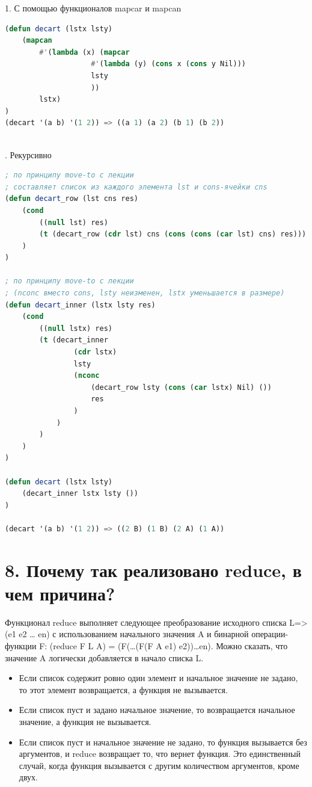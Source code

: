 \documentclass[12pt]{report}
\begin{document}
1. С помощью функционалов mapcar и mapcan
\begin{lstlisting}[language=Lisp]
(defun decart (lstx lsty) 
	(mapcan 
		#'(lambda (x) (mapcar 
					#'(lambda (y) (cons x (cons y Nil))) 
					lsty
					))
		lstx)
)	
(decart '(a b) '(1 2)) => ((a 1) (a 2) (b 1) (b 2))
	
\end{lstlisting}

. Рекурсивно
\begin{lstlisting}[language=Lisp]
; по принципу move-to с лекции
; составляет список из каждого элемента lst и cons-ячейки cns
(defun decart_row (lst cns res) 
	(cond
		((null lst) res)
		(t (decart_row (cdr lst) cns (cons (cons (car lst) cns) res)))
	)
)

; по принципу move-to с лекции 
; (nconc вместо cons, lsty неизменен, lstx уменьшается в размере)
(defun decart_inner (lstx lsty res) 
	(cond
		((null lstx) res)
		(t (decart_inner 
				(cdr lstx) 
				lsty 
				(nconc 
					(decart_row lsty (cons (car lstx) Nil) ())
					res
				)
			)
		)
	)
)	

(defun decart (lstx lsty) 
	(decart_inner lstx lsty ())
)

(decart '(a b) '(1 2)) => ((2 B) (1 B) (2 A) (1 A))	
\end{lstlisting}

\clearpage
\section*{8. Почему так реализовано reduce, в чем причина?}

Функционал reduce выполняет следующее преобразование исходного списка L=>(e1 e2 … en) с использованием начального значения A и бинарной операции-функции F: (reduce F L A) = (F(…(F(F A e1) e2))…en). Можно сказать, что значение A логически добавляется в начало списка L.

\begin{itemize}
	\item Если список содержит ровно один элемент и начальное значение не задано, то этот элемент возвращается, а функция не вызывается. 
	\item Если список пуст и задано начальное значение, то возвращается начальное значение, а функция не вызывается. 
	\item Если список пуст и начальное значение не задано, то функция вызывается без аргументов, и reduce возвращает то, что вернет функция. Это единственный случай, когда функция вызывается с другим количеством аргументов, кроме двух.
\end{itemize}
\end{document}
